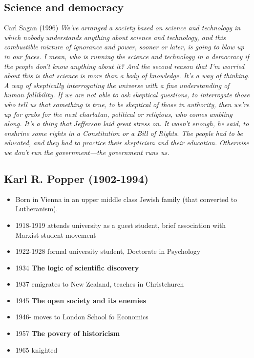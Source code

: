 \subsection{Science and democracy}
Carl Sagan (1996)
\textit{
We’ve arranged a society based on science and technology in which nobody
understands anything about science and technology, and this combustible
mixture of
ignorance and power, sooner or later, is going to blow up in our faces.
I mean, who is
running the science and technology in a democracy if the people don’t know
anything
about it? And the second reason that I’m worried about this is that science is
more than a
body of knowledge. It’s a way of thinking. A way of skeptically interrogating
the universe
with a fine understanding of human fallibility. If we are not able to ask
skeptical
questions, to interrogate those who tell us that something is true, to be
skeptical of those
in authority, then we’re up for grabs for the next charlatan, political or
religious, who
comes ambling along. It’s a thing that Jefferson laid great stress on. It
wasn’t enough, he
said, to enshrine some rights in a Constitution or a Bill of Rights. The
people had to be
educated, and they had to practice their skepticism and their education.
Otherwise we
don’t run the government—the government runs us.}

\subsection{Karl R. Popper (1902-1994)}
\begin{itemize}
	\item Born in Vienna in an upper middle class Jewish family (that
	 converted to Lutheranism).
	\item 1918-1919 attends university as a guest student, brief
	 association with Marxist student movement
	\item 1922-1928 formal university student, Doctorate in Psychology
	\item 1934 \textbf{The logic of scientific discovery}
	\item 1937 emigrates to New Zealand, teaches in Christchurch
	\item 1945 \textbf{The open society and its enemies}
	\item 1946- moves to London School fo Economics
	\item 1957 \textbf{The povery of historicism}
	\item 1965 knighted
\end{itemize}

